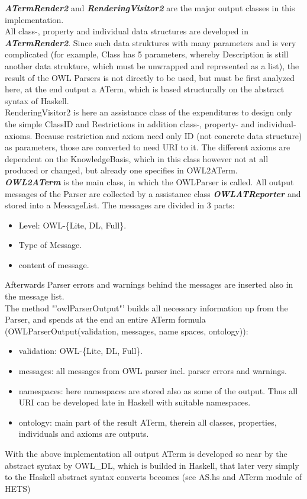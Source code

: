 \documentclass[11pt,a4paper]{article}
\begin{document}
\textbf{\emph{ATermRender2}} and \textbf{\emph{RenderingVisitor2}} are the major output classes in this implementation.\\

All class-, property and individual data structures are developed in \textbf{\emph{ATermRender2}}.  Since such data struktures with many parameters and is very complicated (for example, Class has 5 parameters, whereby Description is still another data strukture, which must be unwrapped and represented as a list), the result of the OWL Parsers is not directly to be used, but must be first analyzed here, at the end output a ATerm, which is based structurally on the abstract syntax of Haskell.\\

RenderingVisitor2 is here an assistance class of the expenditures to design only the simple ClassID and Restrictions in addition class-, property- and individual- axioms.  Because restriction and axiom need only ID (not concrete data structure) as parameters, those are converted to need URI to it.  The different axioms are dependent on the KnowledgeBasis, which in this class however not at all produced or changed, but already one specifies in OWL2ATerm.\\

\textbf{\emph{OWL2ATerm}} is the main class, in which the OWLParser is called.  All output messages of the Parser are collected by a assistance class \textbf{\emph{OWLATReporter}} and stored into a MessageList.  The messages are divided in 3 parts:
	\begin{itemize}
		\item Level: OWL-\{Lite, DL, Full\}.
		\item Type of Message.
		\item content of message.
	\end{itemize} 
Afterwards Parser errors and warnings behind the messages are inserted also in the message list. \\
The method "'owlParserOutput"' builds all necessary information up from the Parser, and spends at the end an entire ATerm formula (OWLParserOutput(validation, messages, name spaces, ontology)):
	\begin{itemize}
		\item validation: OWL-\{Lite, DL, Full\}.
		\item messages: all messages from OWL parser incl. parser errors and warnings.
		\item namespaces: here namespaces are stored also as some of the output. Thus all URI can be developed late in Haskell with suitable namespaces.
		\item ontology: main part of the result ATerm, therein all classes, properties, individuals and axioms are outputs.
	\end{itemize} 
   With the above implementation all output ATerm is developed so near by the abstract syntax by OWL\_DL, which is builded in Haskell, that later very simply to the Haskell abstract syntax converts becomes (see AS.hs and ATerm module of HETS)\\
\end{document}
